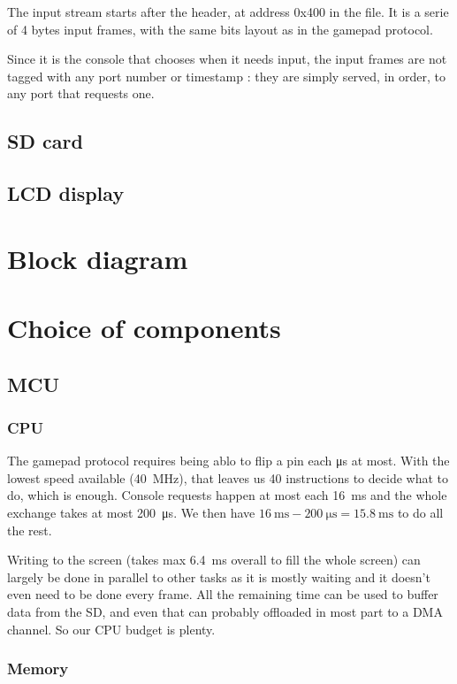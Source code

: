 \documentclass[a4paper,oneside,12pt]{article}
\begin{document}
The input stream starts after the header, at address 0x400 in the file. It is a
serie of 4 bytes input frames, with the same bits layout as in the gamepad
protocol.

Since it is the console that chooses when it needs input, the input frames are
not tagged with any port number or timestamp : they are simply served, in order,
to any port that requests one.

\subsection{SD card}

\subsection{LCD display}

\section{Block diagram}

\section{Choice of components}
\subsection{MCU}
\subsubsection{CPU}
The gamepad protocol requires being ablo to flip a pin each \si{\us} at
most. With the lowest speed available (\SI{40}{\MHz}), that leaves us 40
instructions to decide what to do, which is enough. Console requests happen at
most each \SI{16}{\ms} and the whole exchange takes at most \SI{200}{\us}. We
then have $\SI{16}{\ms} - \SI{200}{\us} = \SI{15.8}{\ms}$ to do all the rest.

Writing to the screen (takes max \SI{6.4}{\ms} overall to fill the whole
screen) can largely be done in parallel to other tasks as it is mostly waiting
and it doesn't even need to be done every frame. All the remaining time can be
used to buffer data from the SD, and even that can probably offloaded in most
part to a DMA channel. So our CPU budget is plenty.

\subsubsection{Memory}
\end{document}
